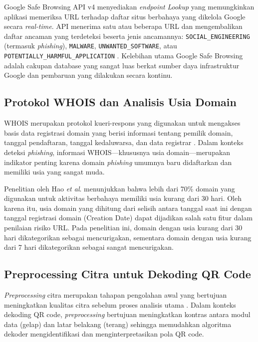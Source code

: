 \documentclass[conference]{IEEEtran}
\begin{document}
Google Safe Browsing API v4 menyediakan \textit{endpoint} \textit{Lookup} yang memungkinkan aplikasi memeriksa URL terhadap daftar situs berbahaya yang dikelola Google secara \textit{real-time}. API menerima satu atau beberapa URL dan mengembalikan daftar ancaman yang terdeteksi beserta jenis ancamannya: \texttt{SOCIAL\_ENGINEERING} (termasuk \textit{phishing}), \texttt{MALWARE}, \texttt{UNWANTED\_SOFTWARE}, atau \texttt{POTENTIALLY\_HARMFUL\_APPLICATION} \cite{google_safebrowsing}. Kelebihan utama Google Safe Browsing adalah cakupan database yang sangat luas berkat sumber daya infrastruktur Google dan pembaruan yang dilakukan secara kontinu.

\subsection{Protokol WHOIS dan Analisis Usia Domain}

WHOIS merupakan protokol kueri-respons yang digunakan untuk mengakses basis data registrasi domain yang berisi informasi tentang pemilik domain, tanggal pendaftaran, tanggal kedaluwarsa, dan data registrar \cite{rfc_3912}. Dalam konteks deteksi \textit{phishing}, informasi WHOIS---khususnya usia domain---merupakan indikator penting karena domain \textit{phishing} umumnya baru didaftarkan dan memiliki usia yang sangat muda.

Penelitian oleh Hao \textit{et al}. \cite{hao_predator_2016} menunjukkan bahwa lebih dari 70\% domain yang digunakan untuk aktivitas berbahaya memiliki usia kurang dari 30 hari. Oleh karena itu, usia domain yang dihitung dari selisih antara tanggal saat ini dengan tanggal registrasi domain (Creation Date) dapat dijadikan salah satu fitur dalam penilaian risiko URL. Pada penelitian ini, domain dengan usia kurang dari 30 hari dikategorikan sebagai mencurigakan, sementara domain dengan usia kurang dari 7 hari dikategorikan sebagai sangat mencurigakan.

\subsection{Preprocessing Citra untuk Dekoding QR Code}

\textit{Preprocessing} citra merupakan tahapan pengolahan awal yang bertujuan meningkatkan kualitas citra sebelum proses analisis utama \cite{gonzalez_digital_2018}. Dalam konteks dekoding QR code, \textit{preprocessing} bertujuan meningkatkan kontras antara modul data (gelap) dan latar belakang (terang) sehingga memudahkan algoritma dekoder mengidentifikasi dan menginterpretasikan pola QR code.
\end{document}
